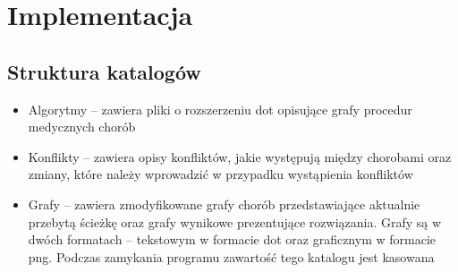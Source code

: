 \chapter{Implementacja}

 
\section{Struktura katalogów}

\begin{itemize}
\item{Algorytmy – zawiera pliki o rozszerzeniu dot opisujące grafy procedur medycznych chorób}
\item{Konflikty – zawiera opisy konfliktów, jakie występują między chorobami oraz zmiany, które należy wprowadzić w przypadku wystąpienia konfliktów}
\item{Grafy – zawiera zmodyfikowane grafy chorób przedstawiające aktualnie przebytą ścieżkę oraz grafy wynikowe prezentujące rozwiązania. Grafy są w dwóch formatach – tekstowym w formacie dot oraz graficznym w formacie png. 
Podczas zamykania programu zawartość tego katalogu jest kasowana}
\end{itemize}
